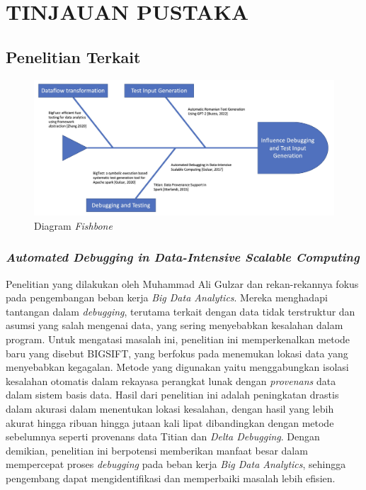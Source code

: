 \chapter{TINJAUAN PUSTAKA}
\label{chap:tinjauanpustaka}

\section{Penelitian Terkait}
\label{sec:penelitianTerkait}

\begin{figure}[H]
  \centering

  \includegraphics[scale=0.17]{gambar/StateOfTheArt.jpg}

  \caption{Diagram \emph{Fishbone}}
  \label{fig:fishbone}
\end{figure}

\subsection{\emph{Automated Debugging in Data-Intensive Scalable Computing}}
\label{subsec:Automated Debugging in Data-Intensive Scalable Computing}

Penelitian yang dilakukan oleh Muhammad Ali Gulzar dan rekan-rekannya fokus pada pengembangan beban kerja \emph{Big Data Analytics}. Mereka menghadapi tantangan dalam \emph{debugging}, terutama terkait dengan data tidak terstruktur dan asumsi yang salah mengenai data, yang sering menyebabkan kesalahan dalam program. Untuk mengatasi masalah ini, penelitian ini memperkenalkan metode baru yang disebut BIGSIFT, yang berfokus pada menemukan lokasi data yang menyebabkan kegagalan. Metode yang digunakan yaitu menggabungkan isolasi kesalahan otomatis dalam rekayasa perangkat lunak dengan \emph{provenans} data dalam sistem basis data. Hasil dari penelitian ini adalah peningkatan drastis dalam akurasi dalam menentukan lokasi kesalahan, dengan hasil yang lebih akurat hingga ribuan hingga jutaan kali lipat dibandingkan dengan metode sebelumnya seperti provenans data Titian dan \emph{Delta Debugging}. Dengan demikian, penelitian ini berpotensi memberikan manfaat besar dalam mempercepat proses \emph{debugging} pada beban kerja \emph{Big Data Analytics}, sehingga pengembang dapat mengidentifikasi dan memperbaiki masalah lebih efisien.

